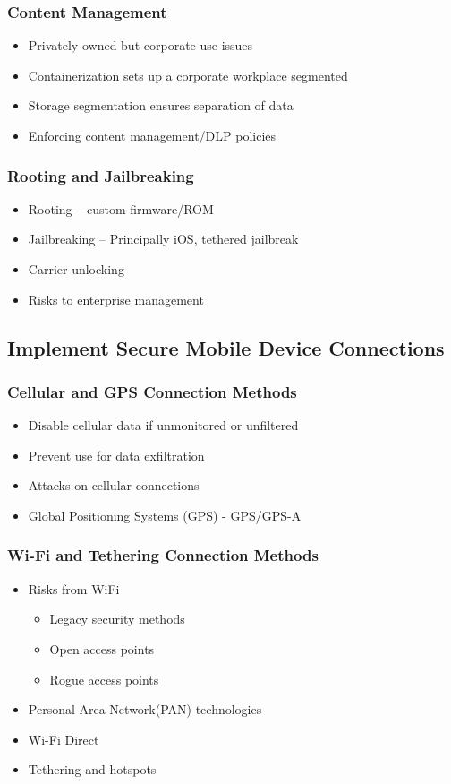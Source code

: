 		\subsubsection {Content Management}
			\begin{itemize}
				\item Privately owned but corporate use issues
				\item Containerization sets up a corporate workplace segmented
				\item Storage segmentation ensures separation of data
				\item Enforcing content management/DLP policies
			\end{itemize}
		\subsubsection {Rooting and Jailbreaking}
			\begin{itemize}
				\item Rooting -- custom firmware/ROM
				\item Jailbreaking -- Principally iOS, tethered jailbreak
				\item Carrier unlocking
				\item Risks to enterprise management
			\end{itemize}
	\subsection {Implement Secure Mobile Device Connections}
		\subsubsection {Cellular and GPS Connection Methods}
			\begin{itemize}
				\item Disable cellular data if unmonitored or unfiltered
				\item Prevent use for data exfiltration
				\item Attacks on cellular connections
				\item Global Positioning Systems (GPS) - GPS/GPS-A
			\end{itemize}
		\subsubsection {Wi-Fi and Tethering Connection Methods}
			\begin{itemize}
				\item Risks from WiFi
					\begin{itemize}
						\item Legacy security methods
						\item Open access points
						\item Rogue access points
					\end{itemize}
				\item Personal Area Network(PAN) technologies
				\item Wi-Fi Direct
				\item Tethering and hotspots
			\end{itemize}
